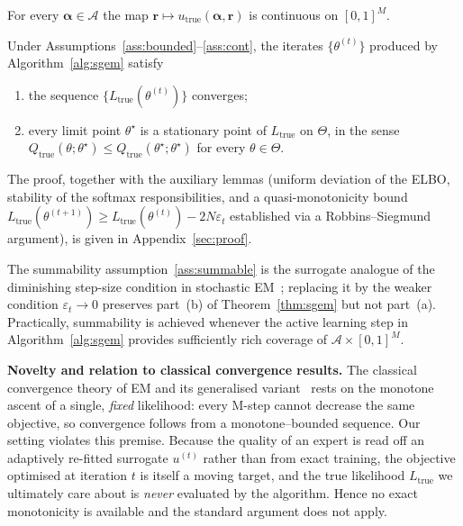\begin{assumption}
\label{ass:cont}
For every $\boldsymbol{\alpha}\in\mathcal{A}$ the map
$\mathbf{r}\mapsto u_{\mathrm{true}}(\boldsymbol{\alpha}, \mathbf{r})$
is continuous on $[0,1]^M$.
\end{assumption}

\begin{theorem}
\label{thm:sgem}
Under Assumptions~\ref{ass:bounded}--\ref{ass:cont}, the iterates
$\{\theta^{(t)}\}$ produced by Algorithm~\ref{alg:sgem} satisfy
\begin{enumerate}
\item[\textup{(a)}] the sequence $\{L_{\mathrm{true}}(\theta^{(t)})\}$ converges;
\item[\textup{(b)}] every limit point $\theta^{\star}$ is a
stationary point of $L_{\mathrm{true}}$ on $\Theta$, in the sense
$Q_{\mathrm{true}}(\theta;\theta^{\star}) \leq
Q_{\mathrm{true}}(\theta^{\star};\theta^{\star})$
for every $\theta\in\Theta$.
\end{enumerate}
\end{theorem}

The proof, together with the auxiliary lemmas (uniform deviation of
the ELBO, stability of the softmax responsibilities, and a
quasi-monotonicity bound
$L_{\mathrm{true}}(\theta^{(t+1)}) \geq L_{\mathrm{true}}(\theta^{(t)})
- 2N\varepsilon_t$ established via a Robbins--Siegmund argument),
is given in Appendix~\ref{sec:proof}.

\begin{remark}
The summability assumption~\ref{ass:summable} is the surrogate
analogue of the diminishing step-size condition in stochastic
EM~\cite{dempster1977em}; replacing it by the weaker condition
$\varepsilon_t\to 0$ preserves part~(b) of Theorem~\ref{thm:sgem} but
not part~(a). Practically, summability is achieved whenever the
active learning step in Algorithm~\ref{alg:sgem} provides
sufficiently rich coverage of $\mathcal{A}\times[0,1]^M$.
\end{remark}

\textbf{Novelty and relation to classical convergence results.} The
classical convergence theory of EM and its generalised
variant~\cite{dempster1977em, wu1983convergence} rests on the monotone
ascent of a single, \emph{fixed} likelihood: every M-step cannot
decrease the same objective, so convergence follows from a
monotone--bounded sequence. Our setting violates this premise. Because
the quality of an expert is read off an adaptively re-fitted surrogate
$u^{(t)}$ rather than from exact training, the objective optimised at
iteration $t$ is itself a moving target, and the true likelihood
$L_{\mathrm{true}}$ we ultimately care about is \emph{never} evaluated by
the algorithm. Hence no exact monotonicity is available and the standard
argument does not apply.


